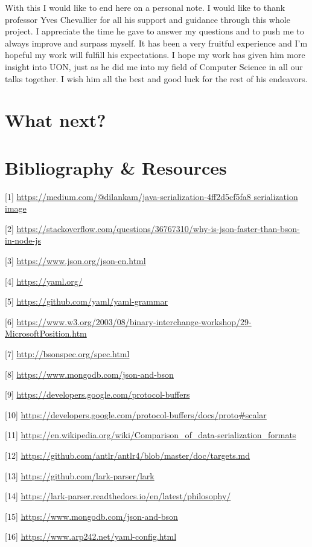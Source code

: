 \documentclass[12pt]{article}
\begin{document}
With this I would like to end here on a personal note. I would like to thank professor Yves Chevallier for all his support and guidance through this whole project. I appreciate the time he gave to answer my questions and to push me to always improve and surpass myself. It has been a very fruitful experience and I'm hopeful my work will fulfill his expectations. I hope my work has given him more insight into UON, just as he did me into my field of Computer Science in all our talks together.
I wish him all the best and good luck for the rest of his endeavors.

\pagebreak

\section{What next?}

\pagebreak

\section{Bibliography \& Resources}
[1] \url{https://medium.com/@dilankam/java-serialization-4ff2d5cf5fa8 serialization image}
 
[2] \url{https://stackoverflow.com/questions/36767310/why-is-json-faster-than-bson-in-node-js} 

[3] \url{https://www.json.org/json-en.html} 

[4] \url{https://yaml.org/} 

[5] \url{https://github.com/yaml/yaml-grammar} 

[6] \url{https://www.w3.org/2003/08/binary-interchange-workshop/29-MicrosoftPosition.htm} 

[7] \url{http://bsonspec.org/spec.html} 

[8] \url{https://www.mongodb.com/json-and-bson} 

[9] \url{https://developers.google.com/protocol-buffers} 

[10] \url{https://developers.google.com/protocol-buffers/docs/proto#scalar} 

[11] \url{https://en.wikipedia.org/wiki/Comparison_of_data-serialization_formats}

[12] \url{https://github.com/antlr/antlr4/blob/master/doc/targets.md}

[13] \url{https://github.com/lark-parser/lark}

[14] \url{https://lark-parser.readthedocs.io/en/latest/philosophy/}

[15] \url{https://www.mongodb.com/json-and-bson}

[16] \url{https://www.arp242.net/yaml-config.html}
\end{document}
